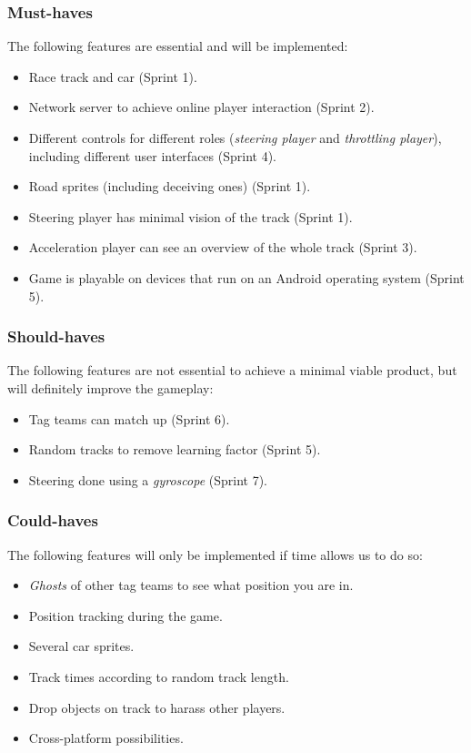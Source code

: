 \documentclass[11pt,twoside,a4paper]{article}
\begin{document}
\subsubsection{Must-haves}
The following features are essential and will be implemented:

\begin{itemize}
	\item Race track and car (Sprint 1).
	\item Network server to achieve online player interaction (Sprint 2).
	\item Different controls for different roles (\emph{steering player} and \emph{throttling player}), including different user interfaces (Sprint 4).
	\item Road sprites (including deceiving ones) (Sprint 1).
  \item Steering player has minimal vision of the track (Sprint 1).
  \item Acceleration player can see an overview of the whole track (Sprint 3).
  \item Game is playable on devices that run on an Android operating system (Sprint 5).
\end{itemize}


\subsubsection{Should-haves}
The following features are not essential to achieve a minimal viable product, but will definitely improve the gameplay:

\begin{itemize}
  \item Tag teams can match up (Sprint 6).
  \item Random tracks to remove learning factor (Sprint 5).
  \item Steering done using a \emph{gyroscope} (Sprint 7).
\end{itemize}


\subsubsection{Could-haves}
The following features will only be implemented if time allows us to do so:

\begin{itemize}
  \item \emph{Ghosts} of other tag teams to see what position you are in.
  \item Position tracking during the game.
  \item Several car sprites.
  \item Track times according to random track length.
  \item Drop objects on track to harass other players.
	\item Cross-platform possibilities.
\end{itemize}
\end{document}
